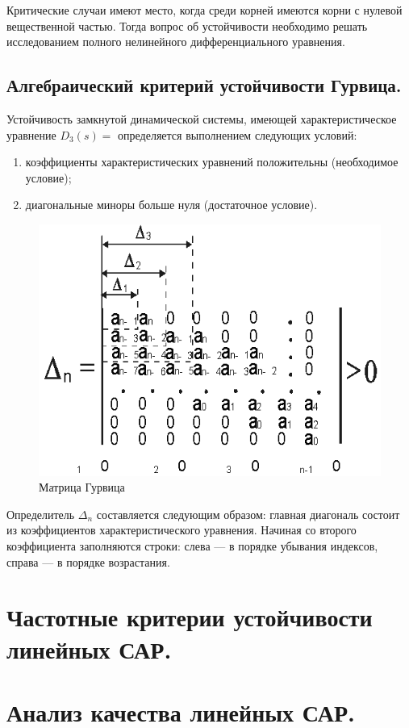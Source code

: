 \documentclass[unicode, 12pt, a4paper, oneside]{article}
\begin{document}
Критические случаи имеют место, когда среди корней имеются корни с нулевой вещественной частью. Тогда вопрос об устойчивости необходимо решать исследованием полного нелинейного дифференциального уравнения.

\subsection{Алгебраический критерий устойчивости Гурвица.}

Устойчивость замкнутой динамической системы, имеющей характеристическое уравнение $ D_3(s) =  $ определяется выполнением следующих условий:
\begin{enumerate}
\item коэффициенты характеристических уравнений положительны (необходимое условие);
\item диагональные миноры больше нуля (достаточное условие).
\end{enumerate}

\begin{figure}[H]
\centering
\includegraphics[width=0.5\linewidth]{26_matrix.png}
\caption{Матрица Гурвица}
\end{figure}

Определитель $ \Delta_n $ составляется следующим образом: главная диагональ состоит из коэффициентов характеристического уравнения. Начиная со второго коэффициента заполняются строки: слева --- в порядке убывания индексов, справа --- в порядке возрастания.

\section{Частотные критерии устойчивости линейных САР.}


\section{Анализ качества линейных САР.}
\end{document}
